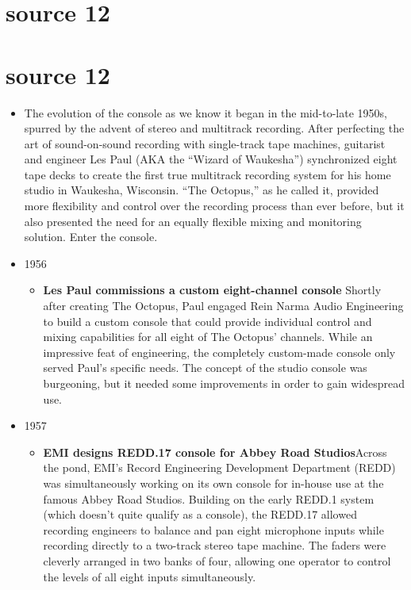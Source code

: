 \documentclass[12pt]{article}
\begin{document}
    \section{source 12 \autocite{sweetwaterLegendaryConsolesTheir2019}}
    \section{source 12 \autocite{HistoryStudioConsole2023}}
        \begin{itemize}
            \item The evolution of the console as we know it began in the mid-to-late 1950s, spurred by the advent of stereo and multitrack recording. After perfecting the art of sound-on-sound recording with single-track tape machines, guitarist and engineer Les Paul (AKA the “Wizard of Waukesha”) synchronized eight tape decks to create the first true multitrack recording system for his home studio in Waukesha, Wisconsin. “The Octopus,” as he called it, provided more flexibility and control over the recording process than ever before, but it also presented the need for an equally flexible mixing and monitoring solution. Enter the console.
            \item 1956
            \begin{itemize}
                \item \textbf{Les Paul commissions a custom eight-channel console} Shortly after creating The Octopus, Paul engaged Rein Narma Audio Engineering to build a custom console that could provide individual control and mixing capabilities for all eight of The Octopus' channels. While an impressive feat of engineering, the completely custom-made console only served Paul's specific needs. The concept of the studio console was burgeoning, but it needed some improvements in order to gain widespread use.
            \end{itemize}
            \item 1957
            \begin{itemize}
                \item \textbf{EMI designs REDD.17 console for Abbey Road Studios}Across the pond, EMI's Record Engineering Development Department (REDD) was simultaneously working on its own console for in-house use at the famous Abbey Road Studios. Building on the early REDD.1 system (which doesn't quite qualify as a console), the REDD.17 allowed recording engineers to balance and pan eight microphone inputs while recording directly to a two-track stereo tape machine. The faders were cleverly arranged in two banks of four, allowing one operator to control the levels of all eight inputs simultaneously.
            \end{itemize}
        \end{itemize}
    \newpage
\end{document}
